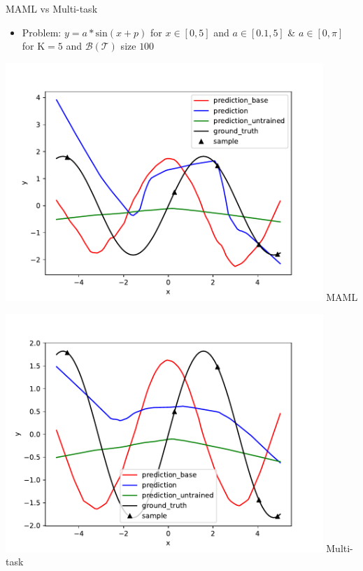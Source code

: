 \begin{frame}{MAML vs Multi-task}
	\begin{itemize}
		\item Problem: $y=a*\text{sin}(x+p)$ for $x\in[0,5]$ and $a\in[0.1,5]$ \& $a\in[0,\pi]$ for $\text{K}=5$ and $\mathcal{B}(\mathcal{T})$ size $100$
	\end{itemize}
	\begin{minipage}{0.5\textwidth}
		\includegraphics[width=0.9\textwidth]{Figures/Study1/sine-hard-finn-maml-pred.pdf}
		\centering
			MAML
	\end{minipage}%
	\begin{minipage}{0.5\textwidth}
		\includegraphics[width=0.9\textwidth]{Figures/Study1/sine-hard-finn-multitask-pred.pdf}
		\centering
			Multi-task
	\end{minipage}
\end{frame}

